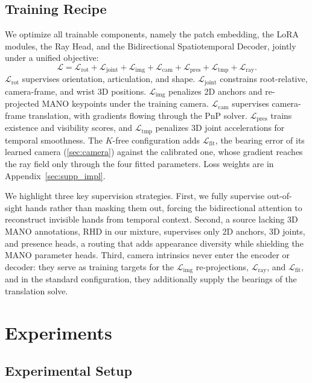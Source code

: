 \documentclass[10pt,twocolumn,letterpaper]{article}
\begin{document}
\subsection{Training Recipe}
\label{sec:recipe}
We optimize all trainable components, namely the patch embedding, the LoRA modules, the Ray Head, and the Bidirectional Spatiotemporal Decoder, jointly under a unified objective:
\begin{equation}
\mathcal{L} = \mathcal{L}_{\mathrm{rot}} + \mathcal{L}_{\mathrm{joint}} + \mathcal{L}_{\mathrm{img}} + \mathcal{L}_{\mathrm{cam}} + \mathcal{L}_{\mathrm{pres}} + \mathcal{L}_{\mathrm{tmp}} + \mathcal{L}_{\mathrm{ray}}.
\label{eq:loss}
\end{equation}
$\mathcal{L}_{\mathrm{rot}}$ supervises orientation, articulation, and shape. $\mathcal{L}_{\mathrm{joint}}$ constrains root-relative, camera-frame, and wrist 3D positions. $\mathcal{L}_{\mathrm{img}}$ penalizes 2D anchors and re-projected MANO keypoints under the training camera. $\mathcal{L}_{\mathrm{cam}}$ supervises camera-frame translation, with gradients flowing through the PnP solver. $\mathcal{L}_{\mathrm{pres}}$ trains existence and visibility scores, and $\mathcal{L}_{\mathrm{tmp}}$ penalizes 3D joint accelerations for temporal smoothness. The $K$-free configuration adds $\mathcal{L}_{\mathrm{fit}}$, the bearing error of its learned camera (\cref{sec:camera}) against the calibrated one, whose gradient reaches the ray field only through the four fitted parameters. Loss weights are in Appendix~\ref{sec:supp_impl}.

We highlight three key supervision strategies. First, we fully supervise out-of-sight hands rather than masking them out, forcing the bidirectional attention to reconstruct invisible hands from temporal context. Second, a source lacking 3D MANO annotations, RHD in our mixture, supervises only 2D anchors, 3D joints, and presence heads, a routing that adds appearance diversity while shielding the MANO parameter heads. Third, camera intrinsics never enter the encoder or decoder: they serve as training targets for the $\mathcal{L}_{\mathrm{img}}$ re-projections, $\mathcal{L}_{\mathrm{ray}}$, and $\mathcal{L}_{\mathrm{fit}}$, and in the standard configuration, they additionally supply the bearings of the translation solve.

\section{Experiments}
\label{sec:exp}
\subsection{Experimental Setup}
\end{document}

